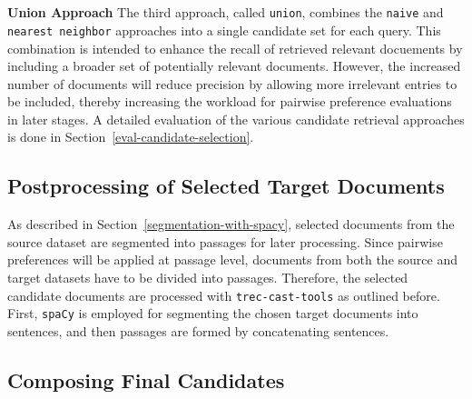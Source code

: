 \\\\
\textbf{Union Approach} The third approach, called \texttt{union}, combines the \texttt{naive} and \texttt{nearest neighbor} approaches into a single candidate set for each query. This combination is intended to enhance the recall of retrieved relevant docuements by including a broader set of potentially relevant documents. However, the increased number of documents will reduce precision by allowing more irrelevant entries to be included, thereby increasing the workload for pairwise preference evaluations in later stages. A detailed evaluation of the various candidate retrieval approaches is done in Section~\ref{eval-candidate-selection}.

\subsection{Postprocessing of Selected Target Documents}\label{postprocessing-of-selected-target-documents}

As described in Section~\ref{segmentation-with-spacy}, selected documents from the source dataset are segmented into passages for later processing. Since pairwise preferences will be applied at passage level, documents from both the source and target datasets have to be divided into passages. Therefore, the selected candidate documents are processed with \texttt{trec-cast-tools} as outlined before. First, \texttt{spaCy} is employed for segmenting the chosen target documents into sentences, and then passages are formed by concatenating sentences.

\subsection{Composing Final Candidates}\label{composing-final-candidates}


